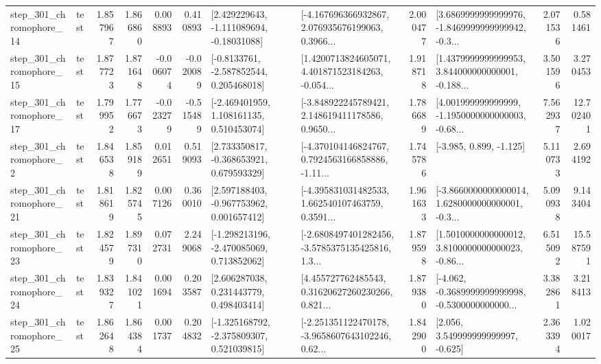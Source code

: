 \begin{tabular}{llrrrrllrlrr}
  step\_301\_chromophore\_14 &      test &      1.857967 &    1.866860 &      0.008893 &  0.410893 &    [2.429229643, -1.111089694, -0.18031088] &  [-4.167696366932867, 2.076935676199063, 0.3966... &       2.000477 &  [3.6869999999999976, -1.8469999999999942, -0.3... &            2.071536 &          0.581461 \\
  step\_301\_chromophore\_15 &      test &      1.877723 &    1.871648 &     -0.006074 & -0.020089 &     [-0.8133761, -2.587852544, 0.205468018] &  [1.4200713824605071, 4.401871523184263, -0.054... &       1.918718 &  [1.4379999999999953, 3.844000000000001, -0.188... &            3.501596 &          3.270453 \\
  step\_301\_chromophore\_17 &      test &      1.799952 &    1.776673 &     -0.023279 & -0.515489 &    [-2.469401959, 1.108161135, 0.510453074] &  [-3.848922245789421, 2.148619411178586, 0.9650... &       1.786689 &  [4.001999999999999, -1.1950000000000003, -0.68... &            7.562937 &         12.702401 \\
   step\_301\_chromophore\_2 &      test &      1.846538 &    1.859189 &      0.012651 &  0.519093 &    [2.733350817, -0.368653921, 0.679593329] &  [-4.370104146824767, 0.7924563166858886, -1.11... &       1.745786 &                            [-3.985, 0.899, -1.125] &            5.110733 &          2.694192 \\
  step\_301\_chromophore\_21 &      test &      1.818619 &    1.825745 &      0.007126 &  0.360010 &    [2.597188403, -0.967753962, 0.001657412] &  [-4.395831031482533, 1.662540107463759, 0.3591... &       1.961633 &  [-3.8660000000000014, 1.6280000000000001, -0.3... &            5.090938 &          9.143404 \\
  step\_301\_chromophore\_23 &      test &      1.824579 &    1.897310 &      0.072731 &  2.249068 &   [-1.298213196, -2.470085069, 0.713852062] &  [-2.6808497401282456, -3.5785375135425816, 1.3... &       1.879598 &  [1.5010000000000012, 3.8100000000000023, -0.86... &            6.515092 &         15.587591 \\
  step\_301\_chromophore\_24 &      test &      1.839327 &    1.841021 &      0.001694 &  0.203587 &     [2.606287038, 0.231443779, 0.498403414] &  [4.455727762485543, 0.31620627260230266, 0.821... &       1.879380 &  [-4.062, -0.3689999999999998, -0.5300000000000... &            3.382861 &          3.218413 \\
  step\_301\_chromophore\_25 &      test &      1.862648 &    1.864384 &      0.001737 &  0.204832 &   [-1.325168792, -2.375809307, 0.521039815] &  [-2.251351122470178, -3.9658607643102246, 0.62... &       1.842900 &                 [2.056, 3.549999999999997, -0.625] &            2.363394 &          1.020017 \\

\end{tabular}
